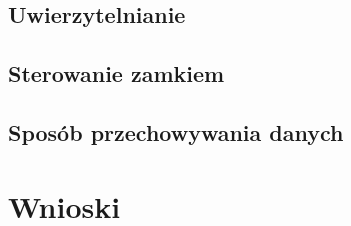 \documentclass[polish,polish,a4paper]{article}
\begin{document}
	\subsection{Uwierzytelnianie}
	
	\subsection{Sterowanie zamkiem}
	
	\subsection{Sposób przechowywania danych}
	
	\section{Wnioski}
	
\end{document}

